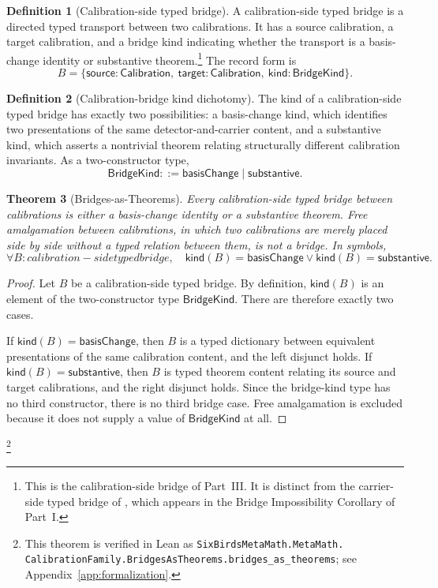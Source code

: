 \documentclass[11pt]{article}
\newcommand{\TypedBridgeCalibration}{calibration-side typed bridge}
\newtheorem{theorem}{Theorem}[section]
\theoremstyle{definition}
\newtheorem{definition}[theorem]{Definition}
\begin{document}
\begin{definition}[Calibration-side typed bridge]\label{def:calibration-side-typed-bridge}
A \TypedBridgeCalibration{} is a directed typed transport between two
calibrations.  It has a source calibration, a target calibration, and a
bridge kind indicating whether the transport is a basis-change identity
or substantive theorem.\footnote{This is the calibration-side bridge of
Part~III.  It is distinct from the carrier-side typed bridge of
, which appears in the Bridge
Impossibility Corollary of Part~I.}
The record form is
\[
  B=\{\mathsf{source}:\mathsf{Calibration},\
      \mathsf{target}:\mathsf{Calibration},\
      \mathsf{kind}:\mathsf{BridgeKind}\}.
\]
\end{definition}

\begin{definition}[Calibration-bridge kind dichotomy]\label{def:bridge-kind}
The kind of a \TypedBridgeCalibration{} has exactly two possibilities:
a basis-change kind, which identifies two presentations of the same
detector-and-carrier content, and a substantive kind, which asserts a
nontrivial theorem relating structurally different calibration
invariants.
As a two-constructor type,
\[
  \mathsf{BridgeKind}
  ::= \mathsf{basisChange}\mid \mathsf{substantive}.
\]
\end{definition}

\begin{theorem}[Bridges-as-Theorems]\label{thm:bridges-as-theorems}
Every calibration-side typed bridge between calibrations is either a
basis-change identity or a substantive theorem.  Free amalgamation
between calibrations, in which two calibrations are merely placed side by
side without a typed relation between them, is not a bridge.
In symbols,
\[
  \forall B:\TypedBridgeCalibration,\quad
  \mathsf{kind}(B)=\mathsf{basisChange}\vee
  \mathsf{kind}(B)=\mathsf{substantive}.
\]
\end{theorem}

\begin{proof}
Let \(B\) be a calibration-side typed bridge.  By definition,
\(\mathsf{kind}(B)\) is an element of the two-constructor type
\(\mathsf{BridgeKind}\).  There are therefore exactly two cases.

If \(\mathsf{kind}(B)=\mathsf{basisChange}\), then \(B\) is a typed
dictionary between equivalent presentations of the same calibration
content, and the left disjunct holds.  If
\(\mathsf{kind}(B)=\mathsf{substantive}\), then \(B\) is typed theorem
content relating its source and target calibrations, and the right
disjunct holds.  Since the bridge-kind type has no third constructor,
there is no third bridge case.  Free amalgamation is excluded because it
does not supply a value of \(\mathsf{BridgeKind}\) at all.
\end{proof}\footnote{\raggedright This theorem is verified in Lean as
\texttt{SixBirdsMetaMath.MetaMath.\allowbreak
CalibrationFamily.BridgesAsTheorems.\allowbreak bridges\_as\_theorems};
see Appendix~\ref{app:formalization}.}
\end{document}
